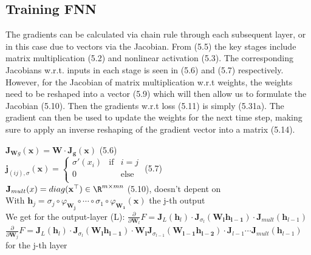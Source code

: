\documentclass[english]{latex4ei/latex4ei_sheet}
\begin{document}
\begin{sectionbox}
\subsection{Training FNN}
The gradients can be calculated via chain rule through each subsequent layer, or in this case due to vectors via the Jacobian. From (5.5) the key stages include matrix multiplication (5.2) and nonlinear activation (5.3). The corresponding Jacobians w.r.t. inputs in each stage is seen in (5.6) and (5.7) respectively. However, for the Jacobian of matrix multiplication w.r.t weights, the weights need to be reshaped into a vector (5.9) which will then allow us to formulate the Jacobian (5.10). Then the gradients w.r.t loss (5.11) is simply (5.31a). The gradient can then be used to update the weights for the next time step, making sure to apply an inverse reshaping of the gradient vector into a matrix (5.14).
\begin{emphbox}
    $\mathbf{J}_{\mathbf{W} g}(\mathbf{x})=\mathbf{W\cdot J_g}(\mathbf{x})$ (5.6)\\
    $\mathbf{j}_{(ij),\sigma}(\mathbf{x}) = \left\{ \begin{array}{rcl}
     \sigma'(x_i) & \mbox{if}
& i=j \\ 0 & & \mbox{else}\\
\end{array}\right.$ (5.7)\\
$\mathbf{J}_{mult}(x)=diag(\mathbf{x}^{\top})\in\R^{m\times mn}$ (5.10), doesn't depent on\\
With $\mathbf{h}_j=\sigma_j\circ\varphi_\mathbf{W_j}\circ\cdots\circ\sigma_1\circ\varphi_{\mathbf{W_1}}(\mathbf{x})$ the j-th output\\
We get for the output-layer (L): $\frac{\partial}{\partial\mathbf{W}_l}F=\mathbf{J}_L(\mathbf{h}_l)\cdot\mathbf{J}_{\sigma_l}(\mathbf{W_lh_{l-1}})\cdot\mathbf{J}_{mult}(\mathbf{h}_{l-1})$\\

$\frac{\partial}{\partial\mathbf{W}_j}F=\mathbf{J}_L(\mathbf{h}_l)\cdot\mathbf{J}_{\sigma_l}(\mathbf{W_lh_{l-1}})\cdot\mathbf{W_l}\mathbf{J}_{\sigma_{l-1}}(\mathbf{W_{l-1}h_{l-2}})\cdot\mathbf{J}_{l-1}\cdots \mathbf{J}_{mult}(\mathbf{h}_{l-1})$ for the j-th layer
\end{emphbox}


\end{sectionbox}
\end{document}
